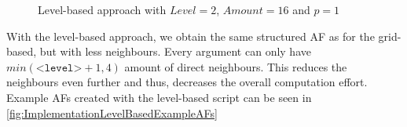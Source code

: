 \begin{figure}[h!]
    \centering
    \caption{Level-based approach with $Level=2$, $Amount=16$ and $p=1$}
    \label{fig:LevelBasedApproach}
\end{figure}


With the level-based approach, we obtain the same structured AF as for the grid-based, but with less neighbours. Every argument can only have $min(\texttt{<level>}+1, 4)$ amount of direct neighbours. This reduces the neighbours even further and thus, decreases the overall computation effort. Example AFs created with the level-based script can be seen in \cref{fig:ImplementationLevelBasedExampleAFs}


